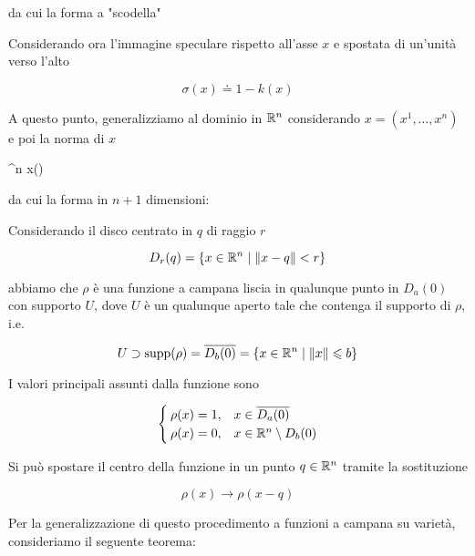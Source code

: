 da cui la forma a "scodella"


Considerando ora l'immagine speculare rispetto all'asse $ x $ e spostata di un'unità verso l'alto

\begin{equation}
	\sigma(x) \doteq 1 - k(x)
\end{equation}


A questo punto, generalizziamo al dominio in $ \mathbb{R}^{n} $ considerando $ x = (x^{1},\dots,x^{n}) $ e poi la norma di $ x $

\map{\rho}
	{\R^{n}}{\R}
	{x}{\sigma()}

da cui la forma in $ n+1 $ dimensioni:


Considerando il disco centrato in $ q $ di raggio $ r $

\begin{equation}
	D_{r}(q) = \{ x \in \mathbb{R}^{n} \mid \norm{x - q} < r \}
\end{equation}

abbiamo che $ \rho $ è una funzione a campana liscia in qualunque punto in $ D_{a}(0) $ con supporto $ U $, dove $ U $ è un qualunque aperto tale che contenga il supporto di $ \rho $, i.e.

\begin{equation}
	U \supset \operatorname{supp}(\rho) = \overline{D_{b}(0)} = \{ x \in \mathbb{R}^{n} \mid \norm{x} \leqslant b \}
\end{equation}

I valori principali assunti dalla funzione sono

\begin{equation}
	\begin{cases}
		\rho(x) = 1, & x \in \overline{D_{a}(0)} \\
		\rho(x) = 0, & x \in \mathbb{R}^{n} \setminus D_{b}(0)
	\end{cases}
\end{equation}

Si può spostare il centro della funzione in un punto $ q \in \mathbb{R}^{n} $ tramite la sostituzione

\begin{equation}
	\rho(x) \to \rho(x-q)
\end{equation}

Per la generalizzazione di questo procedimento a funzioni a campana su varietà, consideriamo il seguente teorema:

